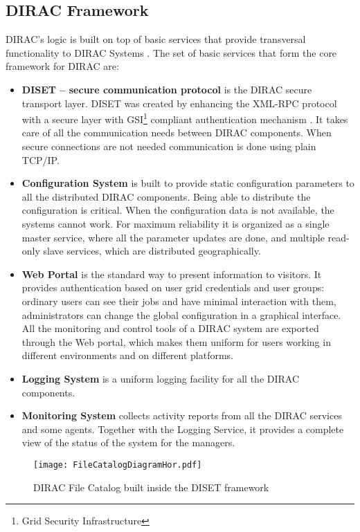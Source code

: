 \subsection{DIRAC Framework}

DIRAC’s logic is built on top of basic services that provide transversal
functionality to DIRAC Systems \cite{DISET}. The set of basic services that form the core framework for
DIRAC are: 
\begin{itemize}

\item \textbf{DISET -- secure communication protocol}
	is the DIRAC secure transport layer. DISET was created by enhancing the XML-RPC
	protocol with a secure layer with GSI\footnote{Grid Security Infrastructure} compliant authentication mechanism 
	\cite{DISET2}. 	It takes care of all the communication needs between DIRAC components. 
	When secure connections are not needed communication is done using plain TCP/IP.
	
\item \textbf{Configuration System}
	is built to provide static configuration parameters to all the distributed DIRAC components. Being able to
	distribute the configuration is critical. When the configuration data is not available, 
	the systems cannot work. For maximum reliability it is organized as a single master service, where 
	all the parameter updates are done, and multiple read-only slave services, which are distributed geographically.

\item \textbf{Web Portal}
	is the standard way to present information to visitors. It provides authentication based on user grid
	credentials and user groups: ordinary users can see their jobs and have minimal interaction with
	them, administrators can change the global configuration in a graphical interface.
	All the monitoring and control tools of a DIRAC system are exported through the Web portal, 
	which makes them uniform for users working in different environments and on different platforms.
	
\item \textbf{Logging System}
	is a uniform logging facility for all the DIRAC components.

\item \textbf{Monitoring System}
	collects activity reports from all the DIRAC services and some agents. Together
	with the Logging Service, it provides a complete view of the status of the system for the managers.
\end{itemize}
\begin{figure}[b]
	\centering
	\texttt{[image: FileCatalogDiagramHor.pdf]}
	\caption{DIRAC File Catalog built inside the DISET framework}
	\label{fig:FCDiag}
\end{figure}

